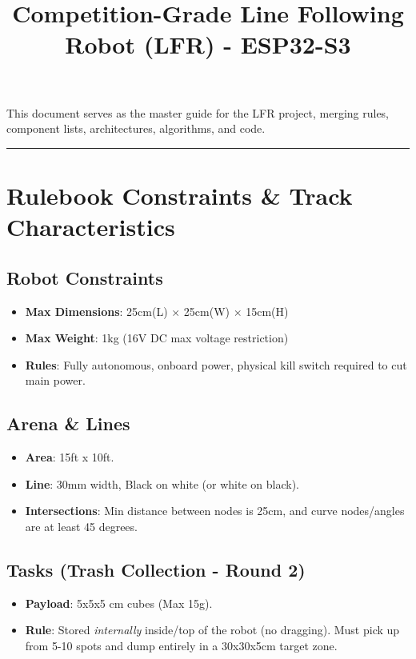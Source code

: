 \documentclass[12pt,a4paper]{article}
\title{\textbf{Competition-Grade Line Following Robot (LFR) - ESP32-S3}}
\author{}
\date{}
\begin{document}
\maketitle

This document serves as the master guide for the LFR project, merging rules, component lists, architectures, algorithms, and code.

\vspace{1em}
\hrule
\vspace{1em}

\section{Rulebook Constraints \& Track Characteristics}

\subsection*{Robot Constraints}
\begin{itemize}
    \item \textbf{Max Dimensions}: 25cm(L) $\times$ 25cm(W) $\times$ 15cm(H)
    \item \textbf{Max Weight}: 1kg (16V DC max voltage restriction)
    \item \textbf{Rules}: Fully autonomous, onboard power, physical kill switch required to cut main power.
\end{itemize}

\subsection*{Arena \& Lines}
\begin{itemize}
    \item \textbf{Area}: 15ft x 10ft.
    \item \textbf{Line}: 30mm width, Black on white (or white on black).
    \item \textbf{Intersections}: Min distance between nodes is 25cm, and curve nodes/angles are at least 45 degrees.
\end{itemize}

\subsection*{Tasks (Trash Collection - Round 2)}
\begin{itemize}
    \item \textbf{Payload}: 5x5x5 cm cubes (Max 15g).
    \item \textbf{Rule}: Stored \textit{internally} inside/top of the robot (no dragging). Must pick up from 5-10 spots and dump entirely in a 30x30x5cm target zone.
\end{itemize}
\end{document}
